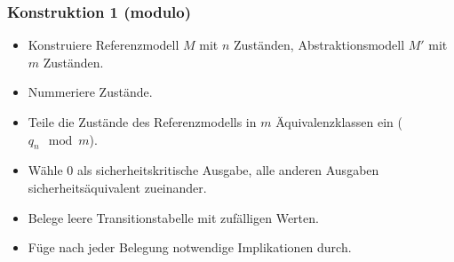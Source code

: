 \begin{frame}
  \frametitle{Konstruktion 1 (modulo)}
  \begin{itemize}
    \item Konstruiere Referenzmodell $M$ mit $n$ Zuständen, Abstraktionsmodell $M'$ mit $m$ Zuständen.
    \item Nummeriere Zustände.
    \item Teile die Zustände des Referenzmodells in $m$ Äquivalenzklassen ein ($q_n \mod m$).
    \item Wähle $0$ als sicherheitskritische Ausgabe, alle anderen Ausgaben sicherheitsäquivalent zueinander.
    \item Belege leere Transitionstabelle mit zufälligen Werten.
    \item Füge nach jeder Belegung notwendige Implikationen durch.
  \end{itemize}
\end{frame}


